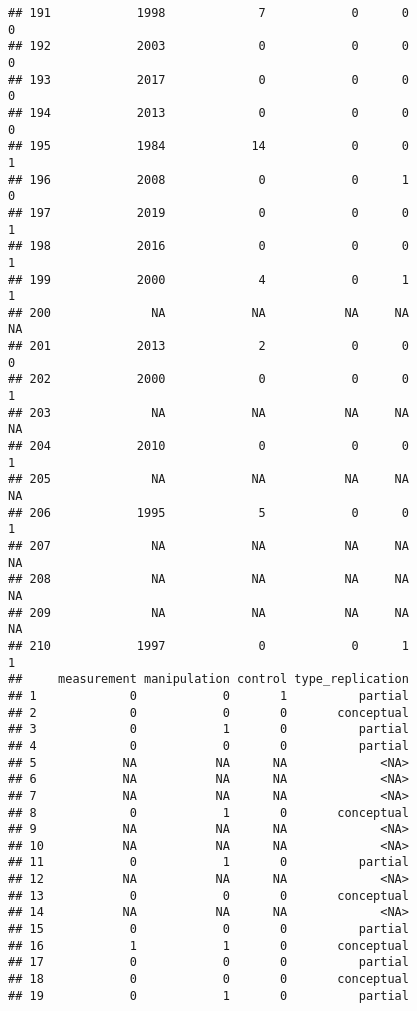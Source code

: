 \documentclass[
  english,
  man]{apa6}
\begin{document}
\begin{verbatim}
## 191            1998             7            0      0               0
## 192            2003             0            0      0               0
## 193            2017             0            0      0               0
## 194            2013             0            0      0               0
## 195            1984            14            0      0               1
## 196            2008             0            0      1               0
## 197            2019             0            0      0               1
## 198            2016             0            0      0               1
## 199            2000             4            0      1               1
## 200              NA            NA           NA     NA              NA
## 201            2013             2            0      0               0
## 202            2000             0            0      0               1
## 203              NA            NA           NA     NA              NA
## 204            2010             0            0      0               1
## 205              NA            NA           NA     NA              NA
## 206            1995             5            0      0               1
## 207              NA            NA           NA     NA              NA
## 208              NA            NA           NA     NA              NA
## 209              NA            NA           NA     NA              NA
## 210            1997             0            0      1               1
##     measurement manipulation control type_replication
## 1             0            0       1          partial
## 2             0            0       0       conceptual
## 3             0            1       0          partial
## 4             0            0       0          partial
## 5            NA           NA      NA             <NA>
## 6            NA           NA      NA             <NA>
## 7            NA           NA      NA             <NA>
## 8             0            1       0       conceptual
## 9            NA           NA      NA             <NA>
## 10           NA           NA      NA             <NA>
## 11            0            1       0          partial
## 12           NA           NA      NA             <NA>
## 13            0            0       0       conceptual
## 14           NA           NA      NA             <NA>
## 15            0            0       0          partial
## 16            1            1       0       conceptual
## 17            0            0       0          partial
## 18            0            0       0       conceptual
## 19            0            1       0          partial

\end{verbatim}
\end{document}
